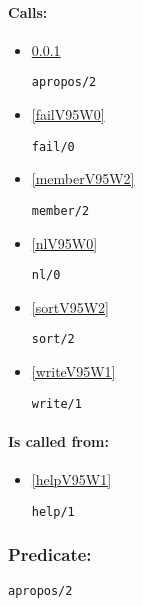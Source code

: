 \paragraph{Calls:} 
\begin{itemize}
\item \ref{aproposV95W2} 
\begin{verbatim}
apropos/2
\end{verbatim}

\item \ref{failV95W0} 
\begin{verbatim}
fail/0
\end{verbatim}

\item \ref{memberV95W2} 
\begin{verbatim}
member/2
\end{verbatim}

\item \ref{nlV95W0} 
\begin{verbatim}
nl/0
\end{verbatim}

\item \ref{sortV95W2} 
\begin{verbatim}
sort/2
\end{verbatim}

\item \ref{writeV95W1} 
\begin{verbatim}
write/1
\end{verbatim}

\end{itemize}
\paragraph{Is called from:} 
\begin{itemize}
\item \ref{helpV95W1} 
\begin{verbatim}
help/1
\end{verbatim}

\end{itemize}

\subsubsection{Predicate:} \label{aproposV95W2}

\begin{verbatim}
apropos/2
\end{verbatim}

